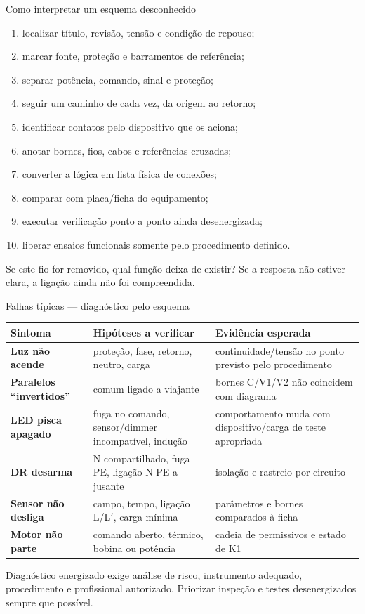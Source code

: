 \begin{frame}{Como interpretar um esquema desconhecido}
\scriptsize
\begin{enumerate}
\item localizar título, revisão, tensão e condição de repouso;
\item marcar fonte, proteção e barramentos de referência;
\item separar potência, comando, sinal e proteção;
\item seguir um caminho de cada vez, da origem ao retorno;
\item identificar contatos pelo dispositivo que os aciona;
\item anotar bornes, fios, cabos e referências cruzadas;
\item converter a lógica em lista física de conexões;
\item comparar com placa/ficha do equipamento;
\item executar verificação ponto a ponto ainda desenergizada;
\item liberar ensaios funcionais somente pelo procedimento definido.
\end{enumerate}
\begin{caixaProjeto}[title=Pergunta obrigatória]
Se este fio for removido, qual função deixa de existir? Se a resposta não estiver clara, a ligação ainda não foi compreendida.
\end{caixaProjeto}
\end{frame}

\begin{frame}{Falhas típicas — diagnóstico pelo esquema}
\scriptsize
\begin{tabularx}{\textwidth}{>{\bfseries}p{2.9cm}X X}
\toprule
Sintoma & Hipóteses a verificar & Evidência esperada \\
\midrule
Luz não acende & proteção, fase, retorno, neutro, carga & continuidade/tensão no ponto previsto pelo procedimento \\
Paralelos “invertidos” & comum ligado a viajante & bornes C/V1/V2 não coincidem com diagrama \\
LED pisca apagado & fuga no comando, sensor/dimmer incompatível, indução & comportamento muda com dispositivo/carga de teste apropriada \\
DR desarma & N compartilhado, fuga PE, ligação N-PE a jusante & isolação e rastreio por circuito \\
Sensor não desliga & campo, tempo, ligação L/L$'$, carga mínima & parâmetros e bornes comparados à ficha \\
Motor não parte & comando aberto, térmico, bobina ou potência & cadeia de permissivos e estado de K1 \\
\bottomrule
\end{tabularx}
\begin{caixaAt}
Diagnóstico energizado exige análise de risco, instrumento adequado, procedimento e profissional autorizado. Priorizar inspeção e testes desenergizados sempre que possível.
\end{caixaAt}
\end{frame}

